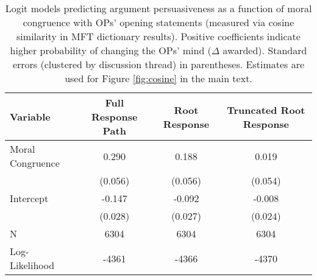 \begin{table}[ht]
\centering
\caption[Logit models predicting argument persuasiveness as a 
            function of moral congruence with OPs' opening statements]{Logit models predicting argument persuasiveness as a 
            function of moral congruence with OPs' opening statements (measured via cosine similarity in 
            MFT dictionary results). Positive coefficients indicate higher probability of changing the OPs'
            mind ($\Delta$ awarded). 
            Standard errors (clustered by discussion thread) in parentheses. Estimates are used for Figure
            \ref{fig:cosine} in the main text.} 
\label{tab:cosine}
\begin{tabular}{lccc}
  \hline
Variable & Full Response Path & Root Response & Truncated Root Response \\ 
  \hline
Moral Congruence &  0.290 &  0.188 &  0.019 \\ 
   & (0.056) & (0.056) & (0.054) \\ 
  Intercept & -0.147 & -0.092 & -0.008 \\ 
   & (0.028) & (0.027) & (0.024) \\ 
   \hline
N & 6304 & 6304 & 6304 \\ 
  Log-Likelihood & -4361 & -4366 & -4370 \\ 
   \hline
\end{tabular}
\end{table}
